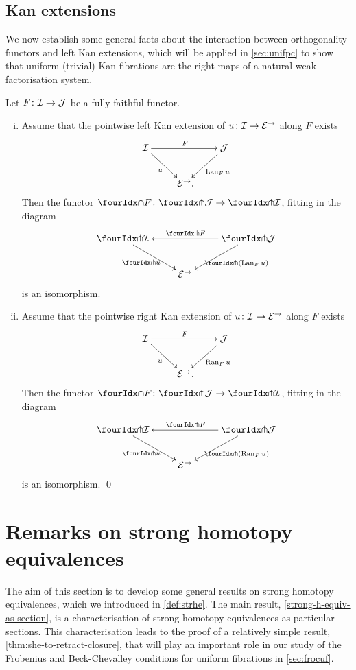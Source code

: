 \documentclass[reqno,10pt,a4paper,oneside]{amsart}
\begin{document}
\subsection*{Kan extensions} We now establish some general facts about the interaction between orthogonality functors and left Kan extensions, which will be applied in \cref{sec:unifpc} to show that uniform (trivial) Kan fibrations are the right maps of a natural weak factorisation system.

\begin{proposition} \label{kan-extension-closure}
Let $F \colon \mathcal{I} \to \mathcal{J}$ be a fully faithful functor.
\begin{enumerate}[(i)]
\item Assume that the pointwise left Kan extension of $u \colon \mathcal{I} \to \mathcal{E}^\to$ along $F$ exists
\[
\xymatrix{
  \cal{I}
  \ar[dr]_{u}
  \ar[rr]^{F}
&&
  \cal{J}
  \ar[dl]^{\Lan_F u}
\\&
  \catE^\to \rlap{.}
}
\]
Then the functor $\liftr{F} \co \liftr{\cal{J}} \to \liftr{\cal{I}}$, fitting in the diagram
\[
\xymatrix{
  \liftr{\cal{I}}
  \ar[dr]_{\liftr{u}}
&&
  \liftr{\cal{J}}
  \ar[ll]_{\liftr{F}}
  \ar[dl]^{\liftr{(\Lan_F u)}}
\\&
  \catE^\to
}
\]
is an isomorphism.
\item Assume that the pointwise right Kan extension of $u \colon \mathcal{I} \to \mathcal{E}^\to$ along $F$ exists
\[
\xymatrix{
  \cal{I}
  \ar[dr]_{u}
  \ar[rr]^{F}
&&
  \cal{J}
  \ar[dl]^{\Ran_F u}
\\&
  \catE^\to \rlap{.}
}
\]
Then the functor $\liftl{F} \co \liftl{\cal{J}} \to \liftl{\cal{I}}$, fitting in the diagram
\[
\xymatrix{
  \liftl{\cal{I}}
  \ar[dr]_{\liftl{u}}
&&
  \liftl{\cal{J}}
  \ar[ll]_{\liftl{F}}
  \ar[dl]^{\liftl{(\Ran_F u)}}
\\&
  \catE^\to
}
\]
is an isomorphism.
\qed
\end{enumerate}
\end{proposition}




\section{Remarks on strong homotopy equivalences}
\label{sec:remshe}

The aim of this section is to develop some general results on strong homotopy equivalences, which we introduced in \cref{def:strhe}.
The main result, \cref{strong-h-equiv-as-section}, is a characterisation of strong homotopy equivalences as particular sections.
This characterisation leads to the proof of a relatively simple result, \cref{thm:she-to-retract-closure}, that will play an important role in our study of the Frobenius and Beck-Chevalley conditions for uniform fibrations in \cref{sec:frocuf}.
\end{document}
